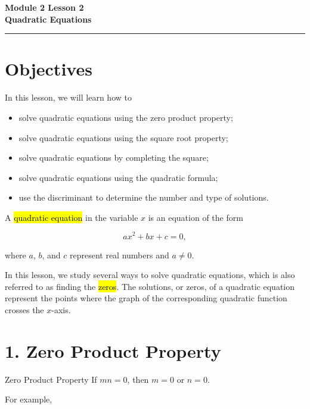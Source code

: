 \documentclass[12pt]{article}
\newcommand{\funhl}[1]{\sethlcolor{highlight}\hl{#1}}
\begin{document}
\handwriting

\begin{center}
    \Large\textbf{\color{primaryblue}Module 2 Lesson 2\\Quadratic Equations} \\
    \vspace{0.2cm}
    \hrule
\end{center}

\section*{Objectives}

\begin{friendlyrule}{In this lesson, we will learn how to}
\begin{itemize}
    \item solve quadratic equations using the zero product property;
    \item solve quadratic equations using the square root property;
    \item solve quadratic equations by completing the square;
    \item solve quadratic equations using the quadratic formula;
    \item use the discriminant to determine the number and type of solutions.
\end{itemize}
\end{friendlyrule}

A \funhl{quadratic equation} in the variable $x$ is an equation of the form

\[
ax^2+bx+c=0,
\]

where $a$, $b$, and $c$ represent real numbers and $a\neq 0$.

In this lesson, we study several ways to solve quadratic equations, which is also referred to as finding the \funhl{zeros}. The solutions, or zeros, of a quadratic equation represent the points where the graph of the corresponding quadratic function crosses the $x$-axis.

\section*{1. Zero Product Property}

\begin{friendlyrule}{Zero Product Property}
If $mn=0$, then $m=0$ or $n=0$.
\end{friendlyrule}

For example,
\end{document}
